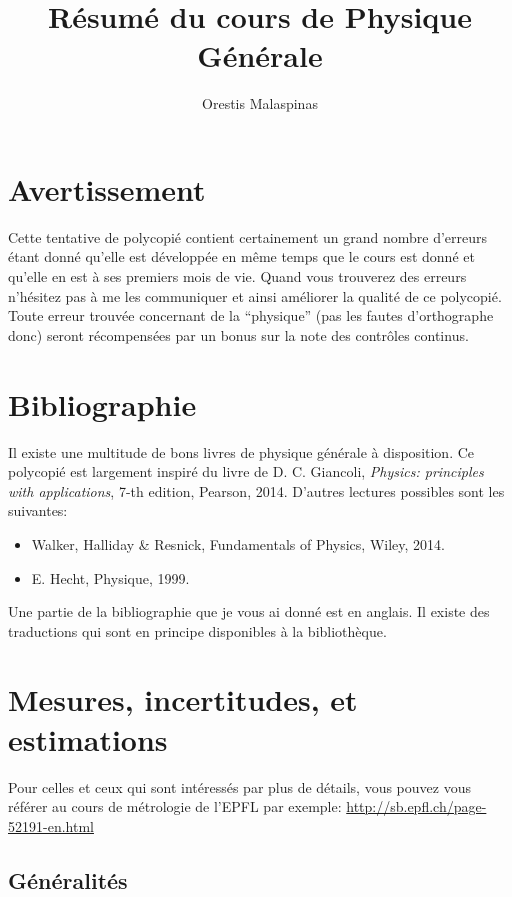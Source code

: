 \documentclass[a4paper,12pt]{book}
\title{Résumé du cours de Physique Générale}
\author{Orestis Malaspinas}
\begin{document}
\maketitle

\chapter*{Avertissement}

Cette tentative de polycopié contient certainement un grand nombre d'erreurs étant donné qu'elle est développée 
en même temps que le cours est donné et qu'elle en est à ses premiers mois de vie. 
Quand vous trouverez des erreurs n'hésitez pas à me les communiquer
et ainsi améliorer la qualité de ce polycopié. Toute erreur trouvée concernant de la ``physique'' (pas les fautes
d'orthographe donc) seront récompensées par un bonus sur la note des contrôles continus.

\chapter*{Bibliographie}

Il existe une multitude de bons livres de physique générale à disposition. Ce polycopié est largement inspiré du livre 
de D. C. Giancoli, \textit{Physics: principles with applications},
7-th edition, Pearson, 2014. D'autres lectures possibles sont les suivantes:
\begin{itemize}
	\item Walker, Halliday \& Resnick, Fundamentals of Physics, Wiley, 2014.
	\item E. Hecht, Physique, 1999.
\end{itemize}
Une partie de la bibliographie que je vous ai donné est en anglais. 
Il existe des traductions qui sont en principe disponibles à 
la bibliothèque. 

\chapter{Mesures, incertitudes, et estimations}

Pour celles et ceux qui sont intéressés par plus de détails, vous pouvez vous référer au cours de métrologie de l'EPFL par exemple: \url{http://sb.epfl.ch/page-52191-en.html}

\section{Généralités}
\end{document}
